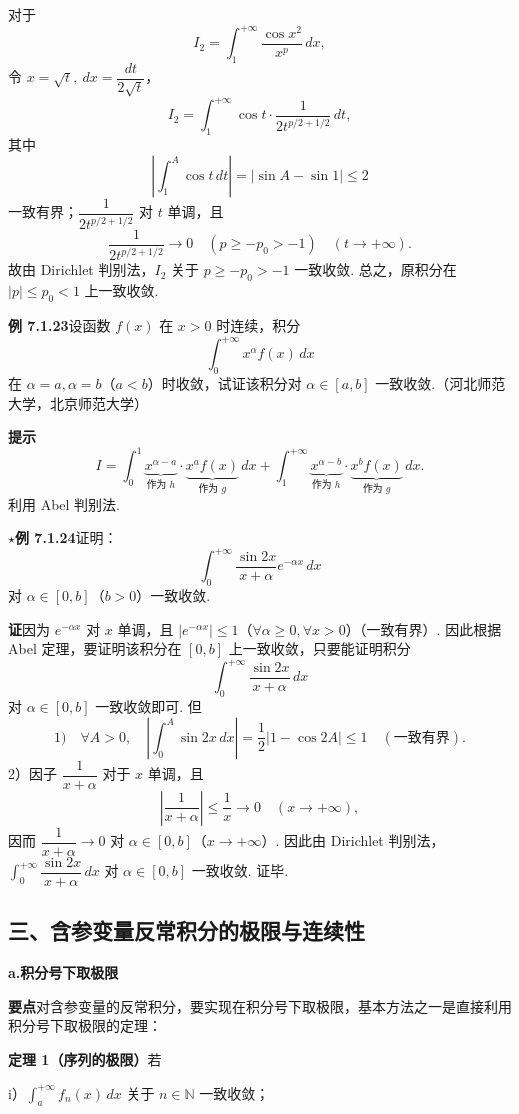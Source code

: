 \documentclass[UTF8,12pt,a4paper,fontset=fandol]{ctexart}
\begin{document}
对于
\[
I_2=\int_1^{+\infty}\frac{\cos x^2}{x^p}\,dx,
\]
令 $x=\sqrt t,\ dx=\dfrac{dt}{2\sqrt t}$，
\[
I_2=\int_1^{+\infty}\cos t\cdot\frac1{2t^{p/2+1/2}}\,dt,
\]
其中
\[
\left|\int_1^A\cos t\,dt\right|=|\sin A-\sin1|\le2
\]
一致有界；$\dfrac1{2t^{p/2+1/2}}$ 对 $t$ 单调，且
\[
\frac1{2t^{p/2+1/2}}\to0\quad(p\ge -p_0>-1)\quad(t\to+\infty).
\]
故由 Dirichlet 判别法，$I_2$ 关于 $p\ge -p_0>-1$ 一致收敛. 总之，原积分在 $|p|\le p_0<1$ 上一致收敛.

\noindent\textbf{例 7.1.23}\quad 设函数 $f(x)$ 在 $x>0$ 时连续，积分
\[
\int_0^{+\infty}x^\alpha f(x)\,dx
\]
在 $\alpha=a,\alpha=b$（$a<b$）时收敛，试证该积分对 $\alpha\in[a,b]$ 一致收敛.（河北师范大学，北京师范大学）

\noindent\textbf{提示}\quad
\[
I=\int_0^1\underbrace{x^{\alpha-a}}_{\text{作为 }h}\cdot\underbrace{x^af(x)}_{\text{作为 }g}\,dx
+\int_1^{+\infty}\underbrace{x^{\alpha-b}}_{\text{作为 }h}\cdot\underbrace{x^bf(x)}_{\text{作为 }g}\,dx.
\]
利用 Abel 判别法.

\noindent\textbf{$\star$例 7.1.24}\quad 证明：
\[
\int_0^{+\infty}\frac{\sin2x}{x+\alpha}e^{-\alpha x}\,dx
\]
对 $\alpha\in[0,b]$（$b>0$）一致收敛.

\noindent\textbf{证}\quad 因为 $e^{-\alpha x}$ 对 $x$ 单调，且 $|e^{-\alpha x}|\le1$（$\forall\alpha\ge0,\forall x>0$）（一致有界）. 因此根据 Abel 定理，要证明该积分在 $[0,b]$ 上一致收敛，只要能证明积分
\[
\int_0^{+\infty}\frac{\sin2x}{x+\alpha}\,dx
\]
对 $\alpha\in[0,b]$ 一致收敛即可. 但
\[
1)\quad \forall A>0,\quad
\left|\int_0^A\sin2x\,dx\right|
=\frac12|1-\cos2A|\le1\quad(\text{一致有界}).
\]
2）因子 $\dfrac1{x+\alpha}$ 对于 $x$ 单调，且
\[
\left|\frac1{x+\alpha}\right|\le\frac1x\to0\quad(x\to+\infty),
\]
因而 $\dfrac1{x+\alpha}\to0$ 对 $\alpha\in[0,b]$（$x\to+\infty$）. 因此由 Dirichlet 判别法，$\displaystyle\int_0^{+\infty}\dfrac{\sin2x}{x+\alpha}\,dx$ 对 $\alpha\in[0,b]$ 一致收敛. 证毕.

\subsection*{三、含参变量反常积分的极限与连续性}

\noindent\textbf{a.\quad 积分号下取极限}

\noindent\textbf{要点}\quad 对含参变量的反常积分，要实现在积分号下取极限，基本方法之一是直接利用积分号下取极限的定理：

\noindent\textbf{定理 1（序列的极限）}\quad 若

i）$\displaystyle\int_a^{+\infty}f_n(x)\,dx$ 关于 $n\in\mathbb{N}$ 一致收敛；
\end{document}
